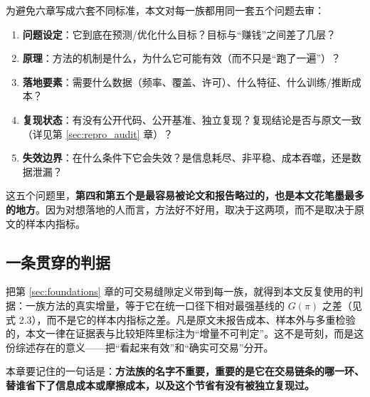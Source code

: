 为避免六章写成六套不同标准，本文对每一族都用同一套五个问题去审：

\begin{enumerate}
  \item \textbf{问题设定}：它到底在预测/优化什么目标？目标与“赚钱”之间差了几层？
  \item \textbf{原理}：方法的机制是什么，为什么它可能有效（而不只是“跑了一遍”）？
  \item \textbf{落地要素}：需要什么数据（频率、覆盖、许可）、什么特征、什么训练/推断成本？
  \item \textbf{复现状态}：有没有公开代码、公开基准、独立复现？复现结论是否与原文一致（详见第 \ref{sec:repro_audit} 章）？
  \item \textbf{失效边界}：在什么条件下它会失效？是信息耗尽、非平稳、成本吞噬，还是数据泄漏？
\end{enumerate}

这五个问题里，\textbf{第四和第五个是最容易被论文和报告略过的，也是本文花笔墨最多的地方}。因为对想落地的人而言，方法好不好用，取决于这两项，而不是取决于原文的样本内指标。

\subsection{一条贯穿的判据}

把第 \ref{sec:foundations} 章的可交易缝隙定义带到每一族，就得到本文反复使用的判据：一族方法的真实增量，等于它在统一口径下相对最强基线的 $G(\pi)$ 之差（见式 2.3），而不是它的样本内指标之差。凡是原文未报告成本、样本外与多重检验的，本文一律在证据表与比较矩阵里标注为“增量不可判定”。这不是苛刻，而是这份综述存在的意义——把“看起来有效”和“确实可交易”分开。

本章要记住的一句话是：\textbf{方法族的名字不重要，重要的是它在交易链条的哪一环、替谁省下了信息成本或摩擦成本，以及这个节省有没有被独立复现过。}

